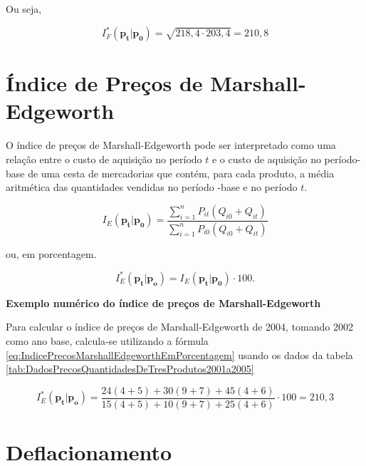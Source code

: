 \documentclass[
]{book}
\begin{document}
Ou seja,

\begin{equation}
  I_F^*(\mathbf{p_t}| \mathbf{p_0}) = \sqrt{218,4 \cdot 203,4} = 210,8
\end{equation}

\hypertarget{uxedndice-de-preuxe7os-de-marshall-edgeworth}{%
\section{Índice de Preços de Marshall-Edgeworth}\label{uxedndice-de-preuxe7os-de-marshall-edgeworth}}

O índice de preços de Marshall-Edgeworth pode ser interpretado como uma relação entre o custo de aquisição no período \(t\) e o custo de aquisição no período-base de uma cesta de
mercadorias que contém, para cada produto, a média aritmética das quantidades vendidas no período -base e no período \(t\).

\begin{equation}
  I_E(\mathbf{p_t}| \mathbf{p_0}) = \frac{\sum_{i=1}^{n}P_{it}(Q_{i0} +
  Q_{it})}{\sum_{i=1}^{n}P_{i0}(Q_{i0} + Q_{it})}
  \label{eq:IndicePrecosMarshallEdgeworth}
\end{equation}

ou, em porcentagem.

\begin{equation}
  I_E^*(\mathbf{p_t}|\mathbf{p_{o}}) = I_E(\mathbf{p_t}| \mathbf{p_0}) \cdot 100.
  \label{eq:IndicePrecosMarshallEdgeworthEmPorcentagem}
\end{equation}

\textbf{Exemplo numérico do índice de preços de Marshall-Edgeworth}

Para calcular o índice de preços de Marshall-Edgeworth de 2004, tomando 2002 como ano base, calcula-se utilizando a fórmula \eqref{eq:IndicePrecosMarshallEdgeworthEmPorcentagem} usando os dados da tabela \ref{tab:DadosPrecosQuantidadesDeTresProdutos2001a2005}

\begin{equation}
  I_E^* (\mathbf{p_t}|\mathbf{p_{o}}) =  \frac{24(4+5) + 30(9+7) + 45(4+6)}{15(4+5) + 10(9+7) + 25(4+6)} \cdot 100 = 210,3
\end{equation}

\hypertarget{deflacionamento}{%
\section{Deflacionamento}\label{deflacionamento}}
\end{document}
